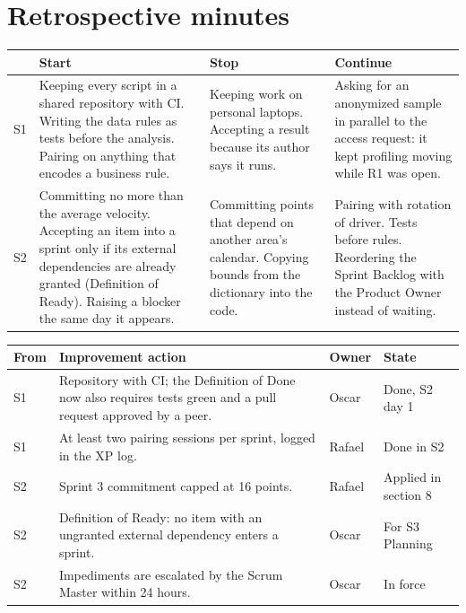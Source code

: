 \documentclass[10pt,a4paper]{article}
\begin{document}
\section{Retrospective minutes}
{\footnotesize
\begin{tabularx}{\linewidth}{@{}l L L L@{}}
\toprule
 & Start & Stop & Continue \\
\midrule
S1 & Keeping every script in a shared repository with CI. Writing the data rules as tests before the analysis. Pairing on anything that encodes a business rule. &
Keeping work on personal laptops. Accepting a result because its author says it runs. &
Asking for an anonymized sample in parallel to the access request: it kept profiling moving while R1 was open. \\
S2 & Committing no more than the average velocity. Accepting an item into a sprint only if its external dependencies are already granted (Definition of Ready). Raising a blocker the same day it appears. &
Committing points that depend on another area's calendar. Copying bounds from the dictionary into the code. &
Pairing with rotation of driver. Tests before rules. Reordering the Sprint Backlog with the Product Owner instead of waiting. \\
\bottomrule
\end{tabularx}

\vspace{4pt}
\begin{tabularx}{\linewidth}{@{}l L l l@{}}
\toprule
From & Improvement action & Owner & State \\
\midrule
S1 & Repository with CI; the Definition of Done now also requires tests green and a pull request approved by a peer. & Oscar & Done, S2 day 1 \\
S1 & At least two pairing sessions per sprint, logged in the XP log. & Rafael & Done in S2 \\
S2 & Sprint 3 commitment capped at 16 points. & Rafael & Applied in section 8 \\
S2 & Definition of Ready: no item with an ungranted external dependency enters a sprint. & Oscar & For S3 Planning \\
S2 & Impediments are escalated by the Scrum Master within 24 hours. & Oscar & In force \\
\bottomrule
\end{tabularx}}
\end{document}
